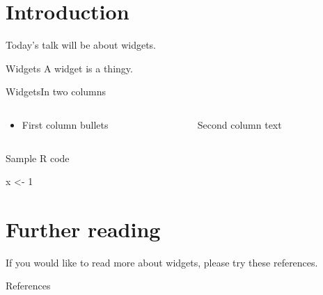 
\date{9 September 2011}
\author{Prof.\ J.\ Bloggs}



\begin{frame}
\maketitle
\end{frame}


\section{Introduction}
Today's talk will be about widgets.  

\begin{frame}{Widgets}
A widget is a thingy.
\end{frame}

\begin{frame}{Widgets}{In two columns}
\begin{columns}[t]
\begin{column}{0.5\textwidth}
\begin{itemize}
\item First column bullets
\end{itemize}
\end{column}
\pause %
\begin{column}{0.5\textwidth}
Second column text \citep{Body2000}
\end{column}
\end{columns}
\end{frame}

\begin{frame}[fragile]{Sample R code}
\begin{rcode}
x <- 1
\end{rcode}
\end{frame}

\section{Further reading}
If you would like to read more about widgets, please try these references.
\begin{frame}[allowframebreaks]{References}


\end{frame}


